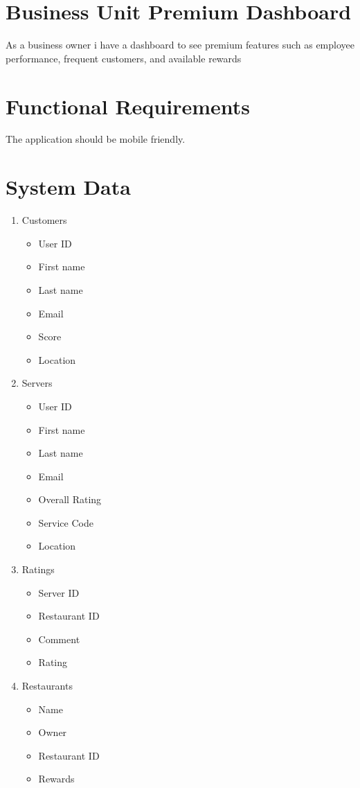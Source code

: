 \documentclass{scrreprt}
\begin{document}
\section{Business Unit Premium Dashboard}
As a business owner i have a dashboard to see premium features such as employee performance, frequent customers, and available rewards

\section{Functional Requirements}
The application should be mobile friendly.

\section{System Data}
\begin{enumerate}
	\item Customers
	\begin{itemize}
		\item User ID
		\item First name
		\item Last name
		\item Email
		\item Score
		\item Location
	\end{itemize}
	\item Servers
	\begin{itemize}
		\item User ID
		\item First name
		\item Last name
		\item Email
		\item Overall Rating
		\item Service Code
		\item Location
	\end{itemize}
	\item Ratings
	\begin{itemize}
		\item Server ID
		\item Restaurant ID
		\item Comment
		\item Rating
	\end{itemize}
	\item Restaurants
	\begin{itemize}
		\item Name
		\item Owner
		\item Restaurant ID
		\item Rewards
	\end{itemize}
\end{enumerate}
\end{document}
